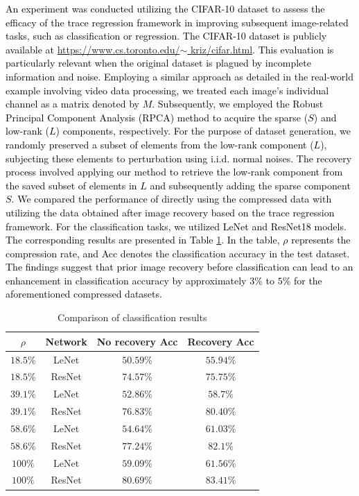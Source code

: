 \documentclass[12pt]{article}
\newcommand{\change}[1]{\textcolor{black}{#1}}
\begin{document}
\change{
 An experiment was conducted utilizing the CIFAR-10 dataset to assess the efficacy of the trace regression framework in improving subsequent image-related tasks, such as classification or regression. The CIFAR-10 dataset is publicly available at \href{https://www.cs.toronto.edu/~kriz/cifar.html}{https://www.cs.toronto.edu/$\sim$ kriz/cifar.html}. This evaluation is particularly relevant when the original dataset is plagued by incomplete information and noise. Employing a similar approach as detailed in the real-world example involving video data processing, we treated each image's individual channel as a matrix denoted by $M$. Subsequently, we employed the Robust Principal Component Analysis (RPCA) method to acquire the sparse ($S$) and low-rank ($L$) components, respectively. For the purpose of dataset generation, we randomly preserved a subset of elements from the low-rank component ($L$), subjecting these elements to perturbation using i.i.d. normal noises. The recovery process involved applying our method to retrieve the low-rank component from the saved subset of elements in $L$ and subsequently adding the sparse component $S$. We compared the performance of directly using the compressed data with utilizing the data obtained after image recovery based on the trace regression framework. For the classification tasks, we utilized LeNet and ResNet18 models. The corresponding results are presented in Table \ref{table:classfication}. In the table, $\rho$ represents the compression rate, and Acc denotes the classification accuracy in the test dataset. The findings suggest that prior image recovery before classification can lead to an enhancement in classification accuracy by approximately $3\%$ to $5\%$ for the aforementioned compressed datasets.
}

\begin{table}[]
    \centering
    \caption{Comparison of classification results}
    \label{table:classfication}
    \begin{tabular}{c|c|c|c}
    \hline
       $\rho$ & Network  &No recovery Acc & Recovery Acc\\
       \hline
        $18.5\%$ & LeNet & $50.59\%$ & $55.94\%$\\
        \hline
         $18.5\%$ & ResNet & $74.57\%$& $75.75\%$\\
        \hline
        $39.1\%$ & LeNet & $52.86\%$ & $58.7\%$\\
        \hline
         $39.1\%$ & ResNet & $76.83\%$ & $80.40\%$\\
        \hline
        $58.6\%$ & LeNet & $54.64\%$ & $61.03\%$\\
        \hline
         $58.6\%$ & ResNet & $77.24\%$ & $82.1\%$\\
        \hline
        $100\%$ & LeNet & $59.09\%$ & $61.56\%$\\
        \hline
        $100\%$ & ResNet & $80.69\%$ & $83.41\%$\\
        \hline
    \end{tabular}
\end{table}
\end{document}
